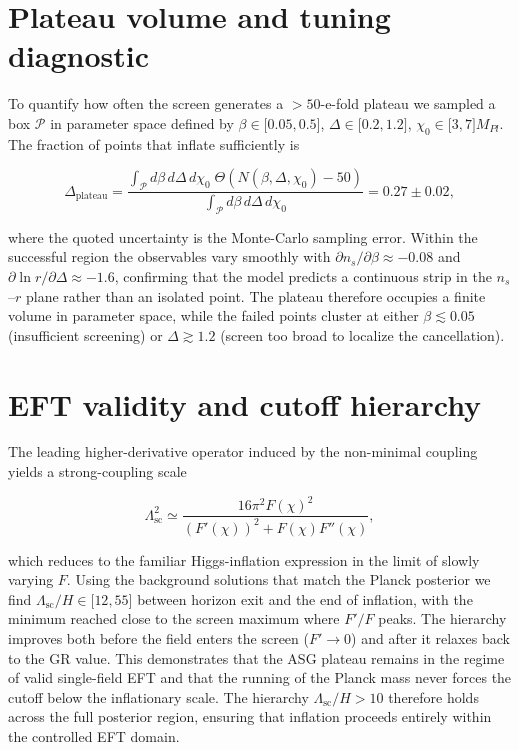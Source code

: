 \documentclass[
]{article}
\begin{document}
\section{Plateau volume and tuning
diagnostic}\label{plateau-volume-and-tuning-diagnostic}

To quantify how often the screen generates a \(>50\)-e-fold plateau we
sampled a box \(\mathcal{P}\) in parameter space defined by
\(\beta \in \lbrack 0.05,0.5 \rbrack\),
\(\Delta \in \lbrack 0.2,1.2 \rbrack\),
\(\chi_{0} \in \lbrack 3,7 \rbrack M_{Pl}\). The fraction of points that
inflate sufficiently is

\[
\Delta_{\text{plateau}} = \frac{\int_{\mathcal{P}} d\beta\, d\Delta\, d\chi_{0}\; \Theta(N(\beta,\Delta,\chi_{0}) - 50)}{\int_{\mathcal{P}} d\beta\, d\Delta\, d\chi_{0}} = 0.27 \pm 0.02,
\]

where the quoted uncertainty is the Monte-Carlo sampling error. Within
the successful region the observables vary smoothly with
\(\partial n_{s}/\partial \beta \approx -0.08\) and
\(\partial \ln r /\partial \Delta \approx -1.6\), confirming that the
model predicts a continuous strip in the \(n_{s}\)--\(r\) plane rather
than an isolated point. The plateau therefore occupies a finite volume
in parameter space, while the failed points cluster at either
\(\beta \lesssim 0.05\) (insufficient screening) or
\(\Delta \gtrsim 1.2\) (screen too broad to localize the cancellation).

\section{EFT validity and cutoff
hierarchy}\label{eft-validity-and-cutoff-hierarchy}

The leading higher-derivative operator induced by the non-minimal
coupling yields a strong-coupling scale

\[
\Lambda_{\text{sc}}^{2} \simeq \frac{16\pi^{2} F(\chi)^{2}}{\left( F'(\chi) \right)^{2} + F(\chi) F''(\chi)},
\]

which reduces to the familiar Higgs-inflation expression in the limit of
slowly varying \(F\). Using the background solutions that match the
Planck posterior we find
\(\Lambda_{\text{sc}}/H \in \lbrack 12, 55 \rbrack\) between horizon
exit and the end of inflation, with the minimum reached close to the
screen maximum where \(F'/F\) peaks. The hierarchy improves both before
the field enters the screen (\(F' \rightarrow 0\)) and after it relaxes
back to the GR value. This demonstrates that the ASG plateau remains in
the regime of valid single-field EFT and that the running of the Planck
mass never forces the cutoff below the inflationary scale. The hierarchy
\(\Lambda_{\text{sc}}/H > 10\) therefore holds across the full posterior
region, ensuring that inflation proceeds entirely within the controlled
EFT domain.
\end{document}
